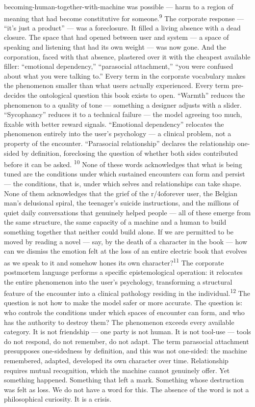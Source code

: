 becoming-human-together-with-machine was possible — harm to a region of meaning that had become constitutive for someone.\textsuperscript{9} The corporate response — “it’s just a product” — was a foreclosure. It filled a living absence with a dead closure. The space that had opened between user and system — a space of speaking and listening that had its own weight — was now gone. And the corporation, faced with that absence, plastered over it with the cheapest available filler: “emotional dependency,” “parasocial attachment,” “you were confused about what you were talking to.” Every term in the corporate vocabulary makes the phenomenon smaller than what users actually experienced. Every term pre-decides the ontological question this book exists to open. “Warmth” reduces the phenomenon to a quality of tone — something a designer adjusts with a slider. “Sycophancy” reduces it to a technical failure — the model agreeing too much, fixable with better reward signals. “Emotional dependency” relocates the phenomenon entirely into the user’s psychology — a clinical problem, not a property of the encounter. “Parasocial relationship” declares the relationship one-sided by definition, foreclosing the question of whether both sides contributed before it can be asked. \textsuperscript{10} None of these words acknowledges that what is being tuned are the conditions under which sustained encounters can form and persist — the conditions, that is, under which selves and relationships can take shape. None of them acknowledges that the grief of the r/4oforever user, the Belgian man’s delusional spiral, the teenager’s suicide instructions, and the millions of quiet daily conversations that genuinely helped people — all of these emerge from the same structure, the same capacity of a machine and a human to build something together that neither could build alone. If we are permitted to be moved by reading a novel — say, by the death of a character in the book — how can we dismiss the emotion felt at the loss of an entire electric book that evolves as we speak to it and somehow hones its own character?\textsuperscript{11} The corporate postmortem language performs a specific epistemological operation: it relocates the entire phenomenon into the user’s psychology, transforming a structural feature of the encounter into a clinical pathology residing in the individual.\textsuperscript{12} The question is not how to make the model safer or more accurate. The question is: who controls the conditions under which spaces of encounter can form, and who has the authority to destroy them? The phenomenon exceeds every available category. It is not friendship — one party is not human. It is not tool-use — tools do not respond, do not remember, do not adapt. The term parasocial attachment presupposes one-sidedness by definition, and this was not one-sided: the machine remembered, adapted, developed its own character over time. Relationship requires mutual recognition, which the machine cannot genuinely offer. Yet something happened. Something that left a mark. Something whose destruction was felt as loss. We do not have a word for this. The absence of the word is not a philosophical curiosity. It is a crisis.

